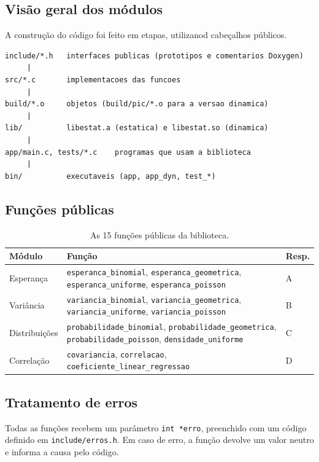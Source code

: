\documentclass[12pt,a4paper]{article}
\newcommand{\cod}[1]{\texttt{#1}}
\begin{document}
\subsection{Visão geral dos módulos}

A construção do código foi feito em etapas, utilizanod cabeçalhos públicos.
\begin{lstlisting}[style=shell]
include/*.h   interfaces publicas (prototipos e comentarios Doxygen)
     |
src/*.c       implementacoes das funcoes
     |
build/*.o     objetos (build/pic/*.o para a versao dinamica)
     |
lib/          libestat.a (estatica) e libestat.so (dinamica)
     |
app/main.c, tests/*.c    programas que usam a biblioteca
     |
bin/          executaveis (app, app_dyn, test_*)
\end{lstlisting}

\subsection{Funções públicas}
\begin{table}[h]
\centering
\small
\begin{tabular}{@{}lp{9.5cm}l@{}}
\toprule
Módulo & Função & Resp. \\
\midrule
Esperança & \cod{esperanca\_binomial}, \cod{esperanca\_geometrica},
            \cod{esperanca\_uniforme}, \cod{esperanca\_poisson} & A \\
Variância & \cod{variancia\_binomial}, \cod{variancia\_geometrica},
            \cod{variancia\_uniforme}, \cod{variancia\_poisson} & B \\
Distribuições & \cod{probabilidade\_binomial}, \cod{probabilidade\_geometrica},
            \cod{probabilidade\_poisson}, \cod{densidade\_uniforme} & C \\
Correlação & \cod{covariancia}, \cod{correlacao},
            \cod{coeficiente\_linear\_regressao} & D \\
\bottomrule
\end{tabular}
\caption{As 15 funções públicas da biblioteca.}
\end{table}

\subsection{Tratamento de erros}
Todas as funções recebem um parâmetro \cod{int *erro}, preenchido com um código
definido em \cod{include/erros.h}. Em caso de erro, a função devolve um valor
neutro e informa a causa pelo código.
\end{document}
